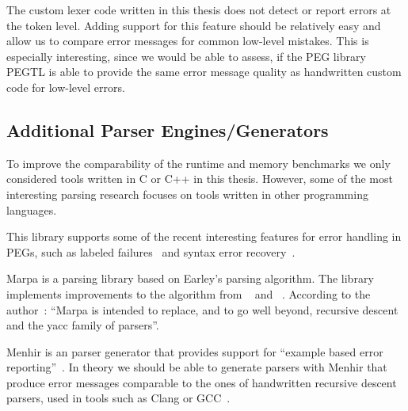 The custom lexer code written in this thesis does not detect or report errors at the \gls{token} level. Adding support for this feature should be relatively easy and allow us to compare error messages for common low-level mistakes. This is especially interesting, since we would be able to assess, if the PEG library \gls{PEGTL} is able to provide the same error message quality as handwritten custom code for low-level errors.

\subsection{Additional Parser Engines/Generators}

To improve the comparability of the runtime and memory benchmarks we only considered tools written in C or C++ in this thesis. However, some of the most interesting parsing research focuses on tools written in other programming languages.

\begin{description}[style=multiline, leftmargin=3cm, font=\bfseries]
  \item[LPegLabel (Lua)] This library supports some of the recent interesting features for error handling in \glspl{PEG}, such as labeled failures~\cite{maidl2016labeled} and syntax error recovery~\cite{medeiros2018recovery}.

  \item[Marpa (Perl)] Marpa is a parsing library based on Earley’s parsing algorithm. The library implements improvements to the algorithm from \citeauthor{leo1991general}~\cite{leo1991general} and \citeauthor{aycock2002practical}~\cite{aycock2002practical}. According to the author~\cite{kegler2019marpa}: “Marpa is intended to replace, and to go well beyond, recursive descent and the yacc family of parsers”.

  \item [Menhir (OCaml)] Menhir is an  parser generator that provides support for “example based error reporting”~\cite{jeffery2003generating, kaestner2018compcert, pottier2019menhir}. In theory we should be able to generate parsers with Menhir that produce error messages comparable to the ones of handwritten recursive descent parsers, used in tools such as Clang or GCC~\cite[p. 2]{kaestner2018compcert}.
\end{description}

